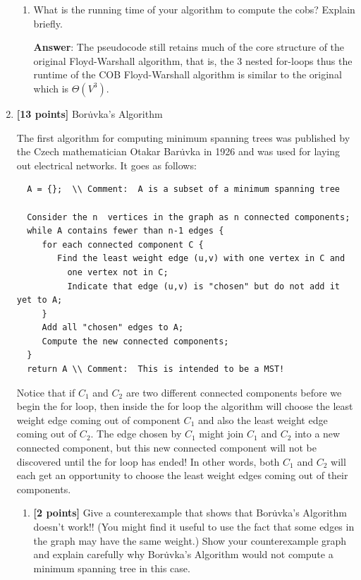 \documentclass[11pt]{article}
\begin{document}
\begin{enumerate}
\begin{enumerate}
\item What is the running time of your algorithm to compute the cobs?  Explain briefly.

\textbf{Answer}:
The pseudocode still retains much of the core structure of the original Floyd-Warshall algorithm, that is, the 3 nested for-loops thus the runtime of the COB Floyd-Warshall algorithm is similar to the original which is $\Theta(V^3)$.


  
  \end{enumerate}

\item \textbf{[13 points]} Bor\.{u}vka's Algorithm

\vspace*{.2cm}
The first algorithm for computing minimum spanning trees was published 
by the Czech mathematician Otakar Bar\.{u}vka in 1926 and was used for 
laying out electrical networks.  It goes as follows:

\begin{verbatim}
  A = {};  \\ Comment:  A is a subset of a minimum spanning tree

  Consider the n  vertices in the graph as n connected components;
  while A contains fewer than n-1 edges {
     for each connected component C {
        Find the least weight edge (u,v) with one vertex in C and 
          one vertex not in C;
          Indicate that edge (u,v) is "chosen" but do not add it yet to A;
     }
     Add all "chosen" edges to A;
     Compute the new connected components;
  }
  return A \\ Comment:  This is intended to be a MST! 
\end{verbatim}

Notice that
if $C_1$ and $C_2$ are two different connected components before we begin the for loop,
then inside the for loop the algorithm will choose the least weight edge coming out of component $C_1$ and also the least weight edge coming out of $C_2$.  The edge chosen by $C_1$ might join $C_1$ and $C_2$ into a new connected component, but this new connected component will not be discovered until the for loop has ended!  In other words, both $C_1$ and $C_2$ will each get an opportunity to choose the least weight edges coming out of their components.

\begin{enumerate}
  \item \textbf{[2 points]} Give a counterexample that shows that Bor\.{u}vka's Algorithm doesn't work!!
  (You might find it useful to use the fact that some edges in the graph may have the same weight.)
  Show your counterexample graph and explain carefully why Bor\.{u}vka's Algorithm would
 not compute a minimum spanning tree in this case.


\end{enumerate}
\end{enumerate}
\end{document}
